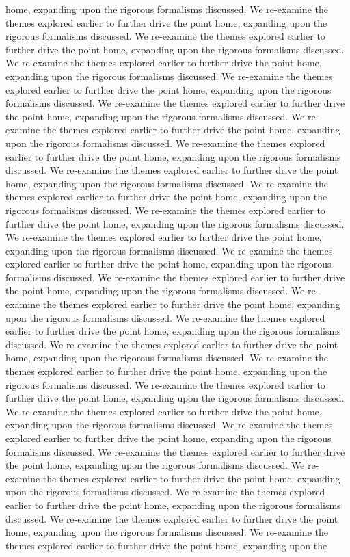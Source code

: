 home, expanding upon the rigorous formalisms discussed. We re-examine the themes explored earlier to further drive the point home, expanding upon the rigorous formalisms discussed. We re-examine the themes explored earlier to further drive the point home, expanding upon the rigorous formalisms discussed. We re-examine the themes explored earlier to further drive the point home, expanding upon the rigorous formalisms discussed. We re-examine the themes explored earlier to further drive the point home, expanding upon the rigorous formalisms discussed. We re-examine the themes explored earlier to further drive the point home, expanding upon the rigorous formalisms discussed. We re-examine the themes explored earlier to further drive the point home, expanding upon the rigorous formalisms discussed. We re-examine the themes explored earlier to further drive the point home, expanding upon the rigorous formalisms discussed. We re-examine the themes explored earlier to further drive the point home, expanding upon the rigorous formalisms discussed. We re-examine the themes explored earlier to further drive the point home, expanding upon the rigorous formalisms discussed. We re-examine the themes explored earlier to further drive the point home, expanding upon the rigorous formalisms discussed. We re-examine the themes explored earlier to further drive the point home, expanding upon the rigorous formalisms discussed. We re-examine the themes explored earlier to further drive the point home, expanding upon the rigorous formalisms discussed. We re-examine the themes explored earlier to further drive the point home, expanding upon the rigorous formalisms discussed. We re-examine the themes explored earlier to further drive the point home, expanding upon the rigorous formalisms discussed. We re-examine the themes explored earlier to further drive the point home, expanding upon the rigorous formalisms discussed. We re-examine the themes explored earlier to further drive the point home, expanding upon the rigorous formalisms discussed. We re-examine the themes explored earlier to further drive the point home, expanding upon the rigorous formalisms discussed. We re-examine the themes explored earlier to further drive the point home, expanding upon the rigorous formalisms discussed. We re-examine the themes explored earlier to further drive the point home, expanding upon the rigorous formalisms discussed. We re-examine the themes explored earlier to further drive the point home, expanding upon the rigorous formalisms discussed. We re-examine the themes explored earlier to further drive the point home, expanding upon the rigorous formalisms discussed. We re-examine the themes explored earlier to further drive the point home, expanding upon the rigorous formalisms discussed. We re-examine the themes explored earlier to further drive the point home, expanding upon the rigorous formalisms discussed. We re-examine the themes explored earlier to further drive the point home, expanding upon the rigorous formalisms discussed. We re-examine the themes explored earlier to further drive the point home, expanding upon the 